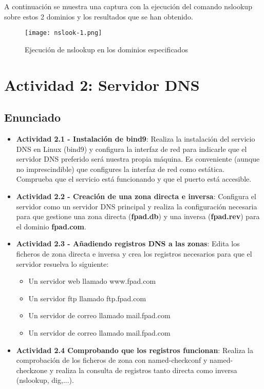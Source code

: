 A continuación se muestra una captura con la ejecución del comando nslookup sobre estos 2 dominios y los resultados que se han obtenido.

\begin{figure}[H]
    \centering
    \texttt{[image: nslook-1.png]}
    \caption{Ejecución de nslookup en los dominios especificados}
\end{figure}

\section{Actividad 2: Servidor DNS}

\subsection{Enunciado}
\begin{itemize}
    \item \textbf{Actividad 2.1 - Instalación de bind9}: Realiza la instalación del servicio DNS en Linux (bind9) y configura la interfaz de red para indicarle que el servidor DNS preferido será nuestra propia máquina. Es conveniente (aunque no imprescindible) que configures la interfaz de red como estática. Comprueba que el servicio está funcionando y que el puerto está accesible.

    \item \textbf{Actividad 2.2 - Creación de una zona directa e inversa}: Configura el servidor como un servidor DNS principal y realiza la configuración necesaria para que gestione una zona directa (\textbf{fpad.db}) y una inversa (\textbf{fpad.rev}) para el dominio \textbf{fpad.com}.

    \item \textbf{Actividad 2.3 - Añadiendo registros DNS a las zonas}: Edita los ficheros de zona directa e inversa y crea los registros necesarios para que el servidor resuelva lo siguiente:
    \begin{itemize}
        \item Un servidor web llamado www.fpad.com
        \item Un servidor ftp llamado ftp.fpad.com
        \item Un servidor de correo llamado mail.fpad.com
        \item Un servidor de correo llamado mail.fpad.com
    \end{itemize}

    \item \textbf{Actividad 2.4 Comprobando que los registros funcionan}: Realiza la comprobación de los ficheros de zona con named-checkconf y named-checkzone y realiza la consulta de registros tanto directa como inversa (nslookup, dig,...).
\end{itemize}

